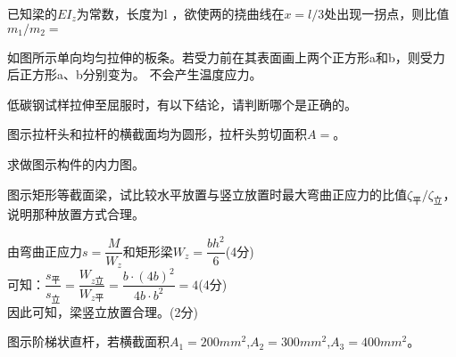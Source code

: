 \documentclass[prescorebox,contitemcnt,answers]{nwsuafexam}%
\begin{document}
\begin{questions}
		\question
		已知梁的$EI_z$为常数，长度为l ，欲使两的挠曲线在$x=l/3$处出现一拐点，则比值$m_1/m_2=$\selectline {}
		
		\question
		如图所示单向均匀拉伸的板条。若受力前在其表面画上两个正方形a和b，则受力后正方形a、b分别变为\selectline。 不会产生温度应力。 
		
		\question
		低碳钢试样拉伸至屈服时，有以下结论，请判断哪个是正确的\selectline。 
		
		\question
		图示拉杆头和拉杆的横截面均为圆形，拉杆头剪切面积$A=$\selectline。
		
		\question[10]
		求做图示构件的内力图。
		
		\question[10]
		图示矩形等截面梁，试比较水平放置与竖立放置时最大弯曲正应力的比值$\zeta_{\text{平}}/\zeta_{\text{立}}$，说明那种放置方式合理。
		\begin{Answers}[5]
			由弯曲正应力$s=\dfrac{M}{W_z}$和矩形梁$W_z=\dfrac{bh^2}{6}$\hfill(4分)\\
			可知：$\dfrac{s_{\text{平}}}{s_{\text{立}}}=\dfrac{W_{z\text{立}}}{W_{z\text{平}}}=\dfrac{b\cdot(4b)^2}{4b\cdot b^2}=4$\hfill(4分)\\
			因此可知，梁竖立放置合理。\hfill(2分)
		\end{Answers}
		
		\question[15]
		图示阶梯状直杆，若横截面积$A_1=200mm^2$,$A_2=300mm^2$,$A_3=400mm^2$。
		

\end{questions}
\end{document}
